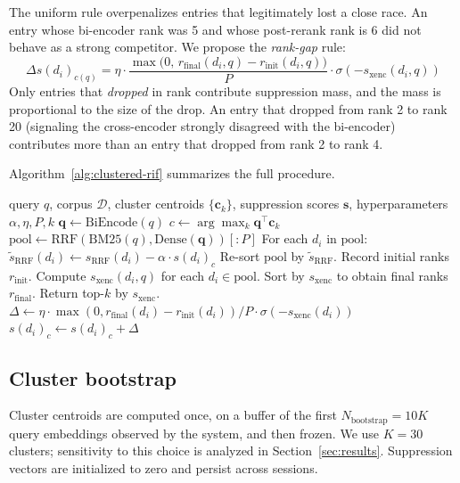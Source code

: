 \documentclass[11pt,a4paper]{article}
\begin{document}
The uniform rule overpenalizes entries that legitimately lost a close race. An entry whose bi-encoder rank was 5 and whose post-rerank rank is 6 did not behave as a strong competitor. We propose the \emph{rank-gap} rule:
\begin{equation}
  \Delta s(d_i)_{c(q)} = \eta \cdot \frac{\max\bigl(0,\, r_{\text{final}}(d_i, q) - r_{\text{init}}(d_i, q)\bigr)}{P} \cdot \sigma(-s_{\text{xenc}}(d_i, q))
  \label{eq:rif-gap}
\end{equation}
Only entries that \emph{dropped} in rank contribute suppression mass, and the mass is proportional to the size of the drop. An entry that dropped from rank 2 to rank 20 (signaling the cross-encoder strongly disagreed with the bi-encoder) contributes more than an entry that dropped from rank 2 to rank 4.

Algorithm~\ref{alg:clustered-rif} summarizes the full procedure.

\begin{algorithm}[ht]
\caption{Retrieve with clustered RIF + rank-gap suppression}
\label{alg:clustered-rif}
\begin{algorithmic}[1]
\Require query $q$, corpus $\mathcal{D}$, cluster centroids $\{\mathbf{c}_k\}$, suppression scores $\mathbf{s}$, hyperparameters $\alpha, \eta, P, k$
\State $\mathbf{q} \gets \mathrm{BiEncode}(q)$
\State $c \gets \arg\max_k \mathbf{q}^\top \mathbf{c}_k$
\State $\mathrm{pool} \gets \mathrm{RRF}(\mathrm{BM25}(q), \mathrm{Dense}(\mathbf{q}))[:P]$
\State For each $d_i$ in $\mathrm{pool}$: $\tilde s_{\text{RRF}}(d_i) \gets s_{\text{RRF}}(d_i) - \alpha \cdot s(d_i)_c$
\State Re-sort $\mathrm{pool}$ by $\tilde s_{\text{RRF}}$. Record initial ranks $r_{\text{init}}$.
\State Compute $s_{\text{xenc}}(d_i, q)$ for each $d_i \in \mathrm{pool}$.
\State Sort by $s_{\text{xenc}}$ to obtain final ranks $r_{\text{final}}$.
\State Return top-$k$ by $s_{\text{xenc}}$.
\Statex
{}
  \State $\Delta \gets \eta \cdot \max(0, r_{\text{final}}(d_i) - r_{\text{init}}(d_i))/P \cdot \sigma(-s_{\text{xenc}}(d_i))$
  \State $s(d_i)_c \gets s(d_i)_c + \Delta$
\EndFor
\end{algorithmic}
\end{algorithm}

\subsection{Cluster bootstrap}

Cluster centroids are computed once, on a buffer of the first $N_{\text{bootstrap}} = 10K$ query embeddings observed by the system, and then frozen. We use $K=30$ clusters; sensitivity to this choice is analyzed in Section~\ref{sec:results}. Suppression vectors are initialized to zero and persist across sessions.
\end{document}

